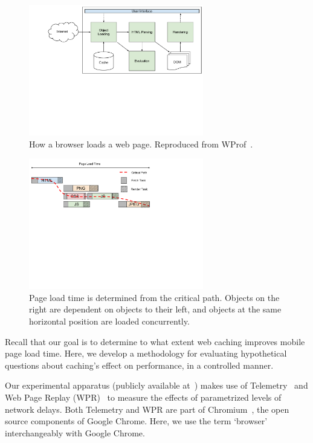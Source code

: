 \begin{figure}[t]
    \hspace{-10pt}
    \includegraphics[width=3in]{../images/network-diagram.pdf}
    \caption[]{\label{fig:network-diagram}How a browser loads a web page. Reproduced from WProf~\cite{wang2013demystifying}.}
\end{figure}

\begin{figure}[t]
    \hspace{-10pt}
    \includegraphics[width=3in]{../images/plt-diagram.pdf}
    \caption[]{\label{fig:plt-diagram} Page load time is determined from the critical path. Objects on the right are dependent on objects to their left, and objects at the same horizontal position are loaded concurrently.}
\end{figure}
\label{setup}
Recall that our goal is to determine to what extent web caching improves mobile page load time.
Here, we develop a methodology for evaluating hypothetical questions about caching's effect on performance, in a controlled manner.

Our experimental apparatus (publicly available at~\cite{jamshed-telemetry}) makes use of Telemetry~\cite{telemetry} and Web Page Replay (WPR)~\cite{wpr} to measure the effects of parametrized levels of network delays.
Both Telemetry and WPR are part of Chromium~\cite{chromium-source}, the open source components of Google Chrome.
Here, we use the term `browser' interchangeably with Google Chrome.

